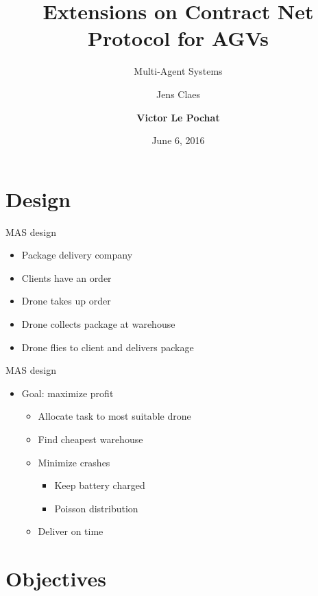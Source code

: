 \documentclass{beamer}
\title{Extensions on Contract Net Protocol for AGVs}
\subtitle{Multi-Agent Systems}
\author{Jens Claes \and \textbf{Victor Le Pochat}}
\date{June 6, 2016}
\begin{document}
	\frame{\titlepage}

	\section{Design}
	
	\begin{frame}{MAS design}
		\begin{itemize}
			\item Package delivery company
			\item Clients have an order
			\item Drone takes up order
			\item Drone collects package at warehouse
			\item Drone flies to client and delivers package
		\end{itemize}
	\end{frame}
	
	\begin{frame}{MAS design}
		\begin{itemize}
			\item Goal: maximize profit
			\begin{itemize}
				\item Allocate task to most suitable drone
				\item Find cheapest warehouse
				\item Minimize crashes
				\begin{itemize}
					\item Keep battery charged
					\item Poisson distribution
				\end{itemize}
				\item Deliver on time
			\end{itemize}
		\end{itemize}
	\end{frame}

	\section{Objectives}
	
\end{document}
